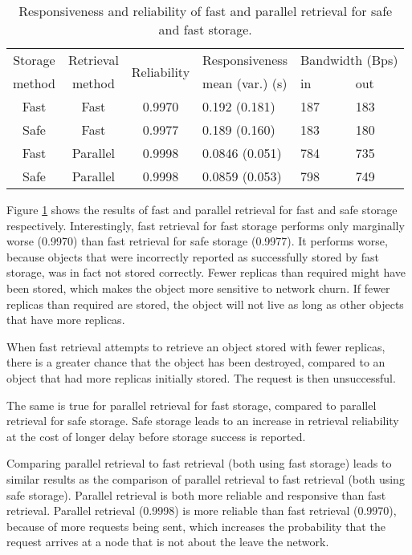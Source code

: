 \begin{table}[htbp]
\centering
\begin{tabular}{|c|c|c|l|l|l|}
\hline
Storage & Retrieval & \multirow{2}{*}{Reliability} & Responsiveness & \multicolumn{2}{c|}{Bandwidth (Bps)} \\
\cline{5-6}
   method      &     method       &             &mean (var.) (s)& in&out\\
\hline
Fast           &   Fast           &   0.9970    &  0.192 (0.181) & 187&183\\
Safe           &   Fast           &   0.9977    &  0.189 (0.160) & 183&180\\
Fast           &   Parallel       &   0.9998    &  0.0846 (0.051)& 784&735\\
Safe           &   Parallel       &   0.9998    &  0.0859 (0.053)& 798&749\\
\hline
\end{tabular}
\caption{Responsiveness and reliability of fast and parallel retrieval for safe and fast storage.}
\label{tab_pithos_results}
\end{table}
%
Figure \ref{tab_pithos_results} shows the results of fast and parallel retrieval for fast and safe storage respectively. Interestingly, fast retrieval for fast storage performs only marginally worse (0.9970) than fast retrieval for safe storage (0.9977). It performs worse, because objects that were incorrectly reported as successfully stored by fast storage, was in fact not stored correctly. Fewer replicas than required might have been stored, which makes the object more sensitive to network churn. If fewer replicas than required are stored, the object will not live as long as other objects that have more replicas.

When fast retrieval attempts to retrieve an object stored with fewer replicas, there is a greater chance that the object has been destroyed, compared to an object that had more replicas initially stored. The request is then unsuccessful.

The same is true for parallel retrieval for fast storage, compared to parallel retrieval for safe storage. Safe storage leads to an increase in retrieval reliability at the cost of longer delay before storage success is reported.

Comparing parallel retrieval to fast retrieval (both using fast storage) leads to similar results as the comparison of parallel retrieval to fast retrieval (both using safe storage). Parallel retrieval is both more reliable and responsive than fast retrieval. Parallel retrieval (0.9998) is more reliable than fast retrieval (0.9970), because of more requests being sent, which increases the probability that the request arrives at a node that is not about the leave the network.

